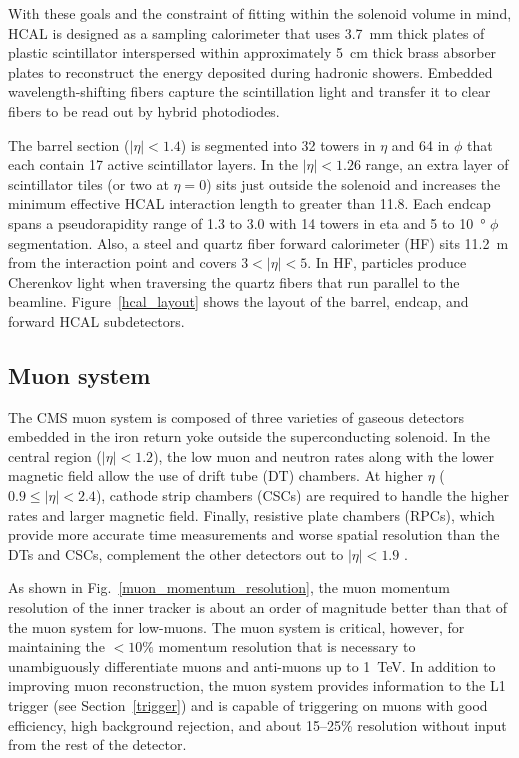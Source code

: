 With these goals and the constraint of fitting within the solenoid volume in mind, HCAL is designed as a sampling calorimeter that uses \SI{3.7}{\milli\metre} thick plates of plastic scintillator interspersed within approximately \SI{5}{\cm} thick brass absorber plates to reconstruct the energy deposited during hadronic showers. Embedded wavelength-shifting fibers capture the scintillation light and transfer it to clear fibers to be read out by hybrid photodiodes.

The barrel section ($|\eta|<1.4$) is segmented into \num{32} towers in $\eta$ and \num{64} in $\phi$ that each contain 17 active scintillator layers. In the $|\eta|<1.26$ range, an extra layer of scintillator tiles (or two at $\eta=0$) sits just outside the solenoid and increases the minimum effective HCAL interaction length to greater than \num{11.8}. Each endcap spans a pseudorapidity range of \num{1.3} to \num{3.0} with \num{14} towers in eta and \num{5} to \SI{10}{\degree} $\phi$ segmentation. Also, a steel and quartz fiber forward calorimeter (HF) sits \SI{11.2}{m} from the interaction point and covers $3<|\eta|<5$. In HF, particles produce Cherenkov light when traversing the quartz fibers that run parallel to the beamline. Figure~\ref{hcal_layout} shows the layout of the barrel, endcap, and forward HCAL subdetectors.



\subsection{Muon system}
The CMS muon system is composed of three varieties of gaseous detectors embedded in the iron return yoke outside the superconducting solenoid. In the central region ($|\eta|<1.2$), the low muon and neutron rates along with the lower magnetic field allow the use of drift tube (DT) chambers. At higher $\eta$ ($0.9\leq|\eta|<2.4$), cathode strip chambers (CSCs) are required to handle the higher rates and larger magnetic field. Finally, resistive plate chambers (RPCs), which provide more accurate time measurements and worse spatial resolution than the DTs and CSCs, complement the other detectors out to $|\eta|<1.9$ \cite{cms_tdr_v1, cms_ms_performance}.

As shown in Fig.~\ref{muon_momentum_resolution}, the muon momentum resolution of the inner tracker is about an order of magnitude better than that of the muon system for low-\pt muons. The muon system is critical, however, for maintaining the $<10\%$ momentum resolution that is necessary to unambiguously differentiate muons and anti-muons up to \SI{1}{\TeV}. In addition to improving muon reconstruction, the muon system provides information to the L1 trigger (see Section~\ref{trigger}) and is capable of triggering on muons with good efficiency, high background rejection, and about 15--25\% \pt resolution without input from the rest of the detector.

